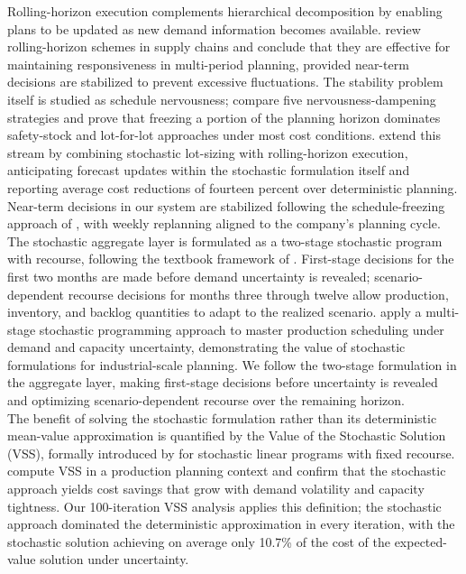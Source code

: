 \documentclass[11pt]{article}
\begin{document}
\indent Rolling-horizon execution complements hierarchical decomposition by enabling plans to be updated as new demand information becomes available. \cite{sahin2013rolling} review rolling-horizon schemes in supply chains and conclude that they are effective for maintaining responsiveness in multi-period planning, provided near-term decisions are stabilized to prevent excessive fluctuations. The stability problem itself is studied as schedule nervousness; \cite{blackburn1986nervousness} compare five nervousness-dampening strategies and prove that freezing a portion of the planning horizon dominates safety-stock and lot-for-lot approaches under most cost conditions. \cite{forel2023stochastic} extend this stream by combining stochastic lot-sizing with rolling-horizon execution, anticipating forecast updates within the stochastic formulation itself and reporting average cost reductions of fourteen percent over deterministic planning. Near-term decisions in our system are stabilized following the schedule-freezing approach of \cite{blackburn1986nervousness}, with weekly replanning aligned to the company's planning cycle.\\
\indent The stochastic aggregate layer is formulated as a two-stage stochastic program with recourse, following the textbook framework of \cite{BirgeLouveaux2011}. First-stage decisions for the first two months are made before demand uncertainty is revealed; scenario-dependent recourse decisions for months three through twelve allow production, inventory, and backlog quantities to adapt to the realized scenario. \cite{korpeoglu2011} apply a multi-stage stochastic programming approach to master production scheduling under demand and capacity uncertainty, demonstrating the value of stochastic formulations for industrial-scale planning. We follow the two-stage formulation in the aggregate layer, making first-stage decisions before uncertainty is revealed and optimizing scenario-dependent recourse over the remaining horizon.\\
\indent The benefit of solving the stochastic formulation rather than its deterministic mean-value approximation is quantified by the Value of the Stochastic Solution (VSS), formally introduced by \cite{birge1982vss} for stochastic linear programs with fixed recourse. \cite{thevenin2021mrp} compute VSS in a production planning context and confirm that the stochastic approach yields cost savings that grow with demand volatility and capacity tightness. Our 100-iteration VSS analysis applies this definition; the stochastic approach dominated the deterministic approximation in every iteration, with the stochastic solution achieving on average only 10.7\% of the cost of the expected-value solution under uncertainty.\\
\end{document}
